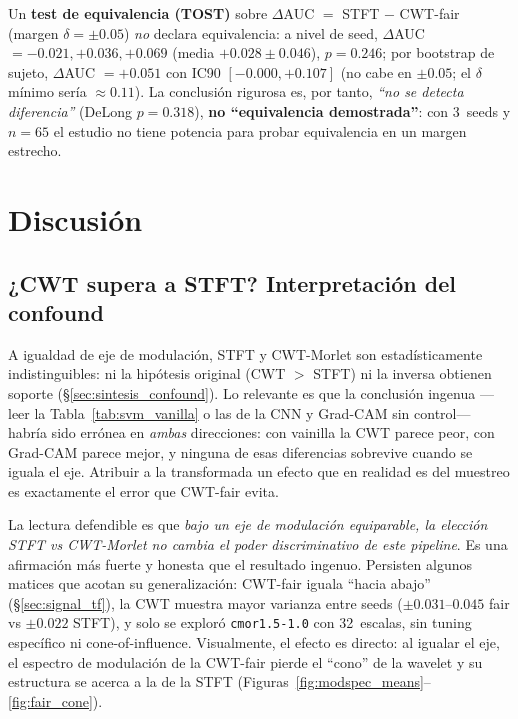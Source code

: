 \documentclass[11pt, a4paper]{article}
\begin{document}
Un \textbf{test de equivalencia (TOST)} sobre $\Delta$AUC $=$ STFT $-$
CWT-fair (margen $\delta=\pm0.05$) \emph{no} declara equivalencia: a nivel
de seed, $\Delta$AUC $=-0.021, +0.036, +0.069$ (media $+0.028\pm0.046$),
$p=0.246$; por bootstrap de sujeto, $\Delta$AUC $=+0.051$ con IC90
$[-0.000, +0.107]$ (no cabe en $\pm0.05$; el $\delta$ mínimo sería
$\approx0.11$). La conclusión rigurosa es, por tanto, \emph{``no se detecta
diferencia''} (DeLong $p=0.318$), \textbf{no ``equivalencia demostrada''}:
con 3~seeds y $n=65$ el estudio no tiene potencia para probar equivalencia
en un margen estrecho.

\section{Discusión}

\subsection{¿CWT supera a STFT? Interpretación del confound}
\label{sec:discusion_cwt}

A igualdad de eje de modulación, STFT y CWT-Morlet son estadísticamente
indistinguibles: ni la hipótesis original (CWT $>$ STFT) ni la inversa
obtienen soporte (§\ref{sec:sintesis_confound}). Lo relevante es que la
conclusión ingenua ---leer la Tabla~\ref{tab:svm_vanilla} o las de la CNN y
Grad-CAM sin control--- habría sido errónea en \emph{ambas} direcciones:
con vainilla la CWT parece peor, con Grad-CAM parece mejor, y ninguna de
esas diferencias sobrevive cuando se iguala el eje. Atribuir a la
transformada un efecto que en realidad es del muestreo es exactamente el
error que CWT-fair evita.

La lectura defendible es que \emph{bajo un eje de modulación equiparable, la
elección STFT vs CWT-Morlet no cambia el poder discriminativo de este
pipeline}. Es una afirmación más fuerte y honesta que el resultado ingenuo.
Persisten algunos matices que acotan su generalización: CWT-fair iguala
``hacia abajo'' (§\ref{sec:signal_tf}), la CWT muestra mayor varianza entre
seeds ($\pm0.031$--$0.045$ fair vs $\pm0.022$ STFT), y solo se exploró
\texttt{cmor1.5-1.0} con 32~escalas, sin tuning específico ni
cone-of-influence. Visualmente, el efecto es directo: al igualar el eje, el
espectro de modulación de la CWT-fair pierde el ``cono'' de la wavelet y su
estructura se acerca a la de la STFT
(Figuras~\ref{fig:modspec_means}--\ref{fig:fair_cone}).
\end{document}
